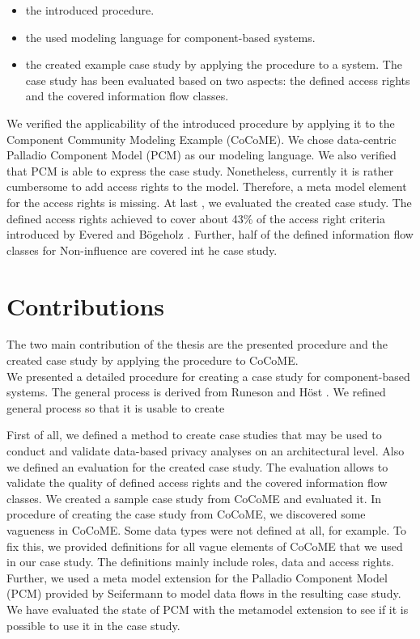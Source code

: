 \begin{itemize}
\item the introduced procedure.
\item the used modeling language for component-based systems.
\item the created example case study by applying the procedure to a system. The case study has been evaluated based on two aspects: the defined access rights and the covered information flow classes.
\end{itemize}
We verified the applicability of the introduced procedure by applying it to the Component Community Modeling Example (CoCoME). We chose data-centric Palladio Component Model (PCM) as our modeling language. We also verified that PCM is able to express the case study. Nonetheless, currently it is rather cumbersome to add access rights to the model. Therefore, a meta model element for the access rights is missing. At last , we evaluated the created case study. The defined access rights achieved to cover about 43\% of the access right criteria introduced by Evered and Bögeholz \cite{CaseStudyAndAccessrigths}. Further, half of the defined information flow classes for Non-influence \citep{Noninfluence} are covered int he case study.

\section{Contributions}
The two main contribution of the thesis are the presented procedure and the created case study by applying the procedure to CoCoME.\\
We presented a detailed procedure for creating a case study for component-based systems. The general process is derived from Runeson and Höst \cite{CaseStudysoftwaresystems}. We refined general process so that it is usable to create 


First of all, we defined a method to create case studies that may be used to conduct and validate data-based privacy analyses on an architectural level. Also we defined an evaluation for the created case study. The evaluation allows to validate the quality of defined access rights and the covered information flow classes. We created a sample case study from CoCoME\cite{CoCoMETechReport} and evaluated it. In procedure of creating the case study from CoCoME, we discovered some vagueness in CoCoME. Some data types were not defined at all, for example. To fix this, we provided definitions for all vague elements of CoCoME that we used in our case study. The definitions mainly include roles, data and access rights. Further, we used a meta model extension for the Palladio Component Model (PCM)\cite{PCM} provided by Seifermann\cite{MMextension} to model data flows in the resulting case study. We have evaluated the state of PCM with the metamodel extension to see if it is possible to use it in the case study.
